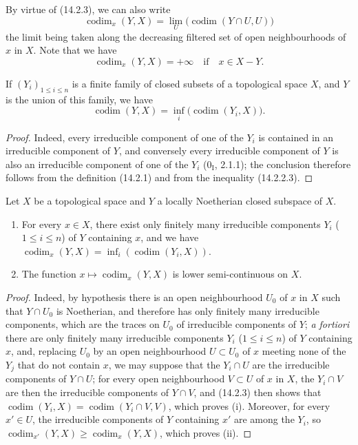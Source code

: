 By virtue of (14.2.3), we can also write
\[
  \operatorname{codim}_x(Y,X)=
  \lim_U\bigl(\operatorname{codim}(Y\cap U,U)\bigr)
  \tag{14.2.4.1}\label{0.14.2.4.1}
\]
the limit being taken along the decreasing filtered set of open
neighbourhoods of $x$ in $X$. Note that we have
\[
  \operatorname{codim}_x(Y,X)=+\infty\quad\text{if}\quad x\in X-Y.
\]

\begin{proposition}[14.2.5]
\label{0.14.2.5}
If $(Y_i)_{1\leq i\leq n}$ is a finite family of closed subsets of a
topological space $X$, and $Y$ is the union of this family, we have
\[
  \operatorname{codim}(Y,X)=
  \inf_i\bigl(\operatorname{codim}(Y_i,X)\bigr).
  \tag{14.2.5.1}\label{0.14.2.5.1}
\]
\end{proposition}

\begin{proof}
Indeed, every irreducible component of one of the $Y_i$ is contained in
an irreducible component of $Y$, and conversely every irreducible
component of $Y$ is also an irreducible component of one of the $Y_i$
($0_{\mathrm I}$, 2.1.1); the conclusion therefore follows from the definition
(14.2.1) and from the inequality (14.2.2.3).
\end{proof}

\begin{corollary}[14.2.6]
\label{0.14.2.6}
Let $X$ be a topological space and $Y$ a locally Noetherian closed
subspace of $X$.
\begin{enumerate}
  \item[\rm(i)] For every $x\in X$, there exist only finitely many
  irreducible components $Y_i$ ($1\leq i\leq n$) of $Y$ containing $x$,
  and we have
  $\operatorname{codim}_x(Y,X)=
  \inf_i(\operatorname{codim}(Y_i,X))$.
  \item[\rm(ii)] The function
  $x\mapsto\operatorname{codim}_x(Y,X)$ is lower semi-continuous
  on $X$.
\end{enumerate}
\end{corollary}

\begin{proof}
Indeed, by hypothesis there is an open neighbourhood $U_0$ of $x$ in $X$ such
that $Y\cap U_0$ is Noetherian, and therefore has only finitely many irreducible
components, which are the traces on $U_0$ of irreducible components of $Y$;
\emph{a fortiori} there are only finitely many irreducible components
$Y_i$ ($1\leq i\leq n$) of $Y$ containing $x$, and, replacing $U_0$
by an open neighbourhood $U\subset U_0$ of $x$ meeting none of the $Y_j$
that do not contain $x$, we may suppose that the $Y_i\cap U$ are the irreducible
components of $Y\cap U$; for every open neighbourhood $V\subset U$ of $x$
in $X$, the $Y_i\cap V$ are then the irreducible components of
$Y\cap V$, and (14.2.3) then shows that
$\operatorname{codim}(Y_i,X)=\operatorname{codim}(Y_i\cap V,V)$, which
proves (i). Moreover, for every $x'\in U$, the irreducible components of
$Y$ containing $x'$ are among the $Y_i$, so
$\operatorname{codim}_{x'}(Y,X)\geq\operatorname{codim}_x(Y,X)$, which
proves (ii).
\end{proof}

